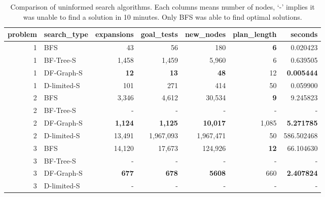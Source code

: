 \documentclass[letterpaper]{article}
\begin{document}
\begin{table}
\begin{tabular}{rlrrrrr}
\toprule
 problem &  search\_type &  expansions &  goal\_tests &  new\_nodes &  plan\_length &     seconds \\
\midrule
       1 &          BFS &          43 &          56 &        180 &            \textbf{6} &    0.020423 \\
       1 &    BF-Tree-S &        1,458 &        1,459 &       5,960 &            6 &    0.639505 \\
       1 &   DF-Graph-S &          \textbf{12} &          \textbf{13} &         \textbf{48} &           12 &    \textbf{0.005444} \\
       1 &  D-limited-S &         101 &         271 &        414 &           50 &    0.059900 \\
\midrule
       2 &          BFS &        3,346 &        4,612 &      30,534 &            \textbf{9} &    9.245823 \\
       2 &    BF-Tree-S &         - &         - &        - &          - &         - \\
       2 &   DF-Graph-S &        \textbf{1,124} &        \textbf{1,125} &      \textbf{10,017} &         1,085 &    \textbf{5.271785} \\
       2 &  D-limited-S &       13,491 &     1,967,093 &    1,967,471 &           50 &  586.502468 \\
\midrule
       3 &          BFS &       14,120 &       17,673 &     124,926 &           \textbf{12} &   66.104630 \\
       3 &    BF-Tree-S &         - &         - &        - &          - &         - \\
       3 &   DF-Graph-S &         \textbf{677} &         \textbf{678} &       \textbf{5608} &          660 &    \textbf{2.407824} \\
       3 &  D-limited-S &         - &         - &        - &          - &         - \\
\bottomrule
\end{tabular}
\caption{Comparison of uninformed search algorithms. Each columns means number of nodes, `-' implies it was unable to find a solution in 10 minutes. Only BFS was able to find optimal solutions.}
\label{table:usa}
\end{table}
\end{document}

